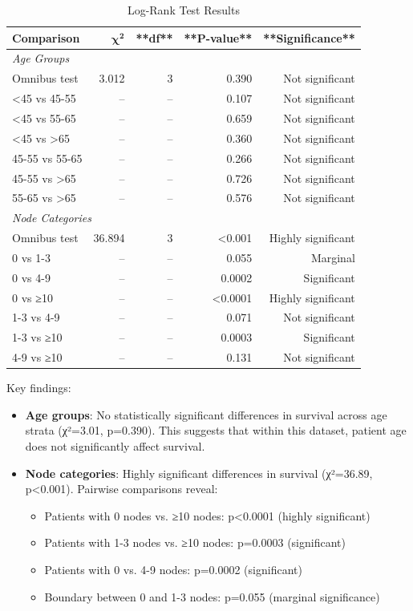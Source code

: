 \documentclass[12pt,a4paper]{article}
\begin{document}
\begin{table}[H]
\centering
\caption{Log-Rank Test Results}
\label{tab:logrank_results}
\begin{tabular}{lrrrr}
\toprule
\textbf{Comparison} & \(\boldsymbol{\chi^2}\) & **df** & **P-value** & **Significance** \\
\midrule
\multicolumn{5}{l}{\textit{Age Groups}} \\
Omnibus test & 3.012 & 3 & 0.390 & Not significant \\
\cmidrule(l){2-5}
<45 vs 45-55 & -- & -- & 0.107 & Not significant \\
<45 vs 55-65 & -- & -- & 0.659 & Not significant \\
<45 vs >65 & -- & -- & 0.360 & Not significant \\
45-55 vs 55-65 & -- & -- & 0.266 & Not significant \\
45-55 vs >65 & -- & -- & 0.726 & Not significant \\
55-65 vs >65 & -- & -- & 0.576 & Not significant \\
\midrule
\multicolumn{5}{l}{\textit{Node Categories}} \\
Omnibus test & 36.894 & 3 & <0.001 & Highly significant \\
\cmidrule(l){2-5}
0 vs 1-3 & -- & -- & 0.055 & Marginal \\
0 vs 4-9 & -- & -- & 0.0002 & Significant \\
0 vs ≥10 & -- & -- & <0.0001 & Highly significant \\
1-3 vs 4-9 & -- & -- & 0.071 & Not significant \\
1-3 vs ≥10 & -- & -- & 0.0003 & Significant \\
4-9 vs ≥10 & -- & -- & 0.131 & Not significant \\
\bottomrule
\end{tabular}
\end{table}

Key findings:
\begin{itemize}
    \item \textbf{Age groups}: No statistically significant differences in survival across age strata (χ²=3.01, p=0.390). This suggests that within this dataset, patient age does not significantly affect survival.
    
    \item \textbf{Node categories}: Highly significant differences in survival (χ²=36.89, p<0.001). Pairwise comparisons reveal:
    \begin{itemize}
        \item Patients with 0 nodes vs. ≥10 nodes: p<0.0001 (highly significant)
        \item Patients with 1-3 nodes vs. ≥10 nodes: p=0.0003 (significant)
        \item Patients with 0 vs. 4-9 nodes: p=0.0002 (significant)
        \item Boundary between 0 and 1-3 nodes: p=0.055 (marginal significance)
    \end{itemize}
\end{itemize}
\end{document}
